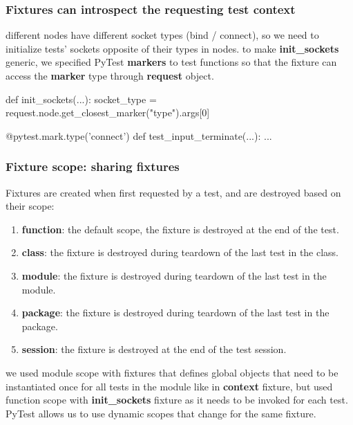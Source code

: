 \subsubsection{Fixtures can introspect the requesting test context}
different nodes have different socket types (bind / connect), so we need to initialize tests' sockets opposite of their types in nodes. to make \textbf{init\_sockets} generic, we specified PyTest \textbf{markers} to test functions so that the fixture can access the \textbf{marker} type through \textbf{request} object.

\begin{python}
def init_sockets(...):
    socket_type = request.node.get_closest_marker("type").args[0]

@pytest.mark.type('connect')
def test_input_terminate(...):
    ...
\end{python}


\subsubsection{Fixture scope: sharing fixtures}
Fixtures are created when first requested by a test, and are destroyed based on their scope:
\begin{enumerate}

    \item \textbf{function}: the default scope, the fixture is destroyed at the end of the test.

    \item \textbf{class}: the fixture is destroyed during teardown of the last test in the class.

    \item \textbf{module}: the fixture is destroyed during teardown of the last test in the module.

    \item \textbf{package}: the fixture is destroyed during teardown of the last test in the package.

    \item \textbf{session}: the fixture is destroyed at the end of the test session.

\end{enumerate}

we used module scope with fixtures that defines global objects that need to be instantiated once for all tests in the module like in \textbf{context} fixture, but used function scope with \textbf{init\_sockets} fixture as it needs to be invoked for each test. PyTest allows us to use dynamic scopes that change for the same fixture.

